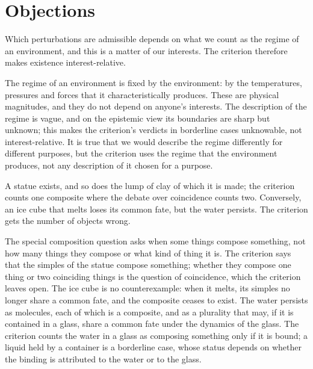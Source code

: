 \documentclass{situationist-preprint}
\begin{document}
\section{Objections}

\begin{objection}
Which perturbations are admissible depends on what we count as the regime of an environment, and this is a matter of our interests. The criterion therefore makes existence interest-relative.
\end{objection}

\begin{reply}
The regime of an environment is fixed by the environment: by the temperatures, pressures and forces that it characteristically produces. These are physical magnitudes, and they do not depend on anyone's interests. The description of the regime is vague, and on the epistemic view its boundaries are sharp but unknown; this makes the criterion's verdicts in borderline cases unknowable, not interest-relative. It is true that we would describe the regime differently for different purposes, but the criterion uses the regime that the environment produces, not any description of it chosen for a purpose.
\end{reply}

\begin{objection}
A statue exists, and so does the lump of clay of which it is made; the criterion counts one composite where the debate over coincidence counts two. Conversely, an ice cube that melts loses its common fate, but the water persists. The criterion gets the number of objects wrong.
\end{objection}

\begin{reply}
The special composition question asks when some things compose something, not how many things they compose or what kind of thing it is. The criterion says that the simples of the statue compose something; whether they compose one thing or two coinciding things is the question of coincidence, which the criterion leaves open. The ice cube is no counterexample: when it melts, its simples no longer share a common fate, and the composite ceases to exist. The water persists as molecules, each of which is a composite, and as a plurality that may, if it is contained in a glass, share a common fate under the dynamics of the glass. The criterion counts the water in a glass as composing something only if it is bound; a liquid held by a container is a borderline case, whose status depends on whether the binding is attributed to the water or to the glass.
\end{reply}
\end{document}
